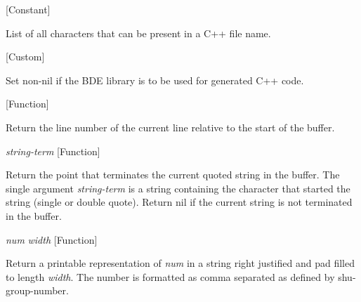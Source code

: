 \vspace{1em}
\noindent
{}
\usebox{\funcname}
 \hfill [Constant]

\begin{doc-string}
List of all characters that can be present in a C++ file name.
\end{doc-string}

\vspace{1em}
\noindent
{}
\usebox{\funcname}
 \hfill [Custom]

\begin{doc-string}
Set non-nil if the BDE library is to be used for generated C++ code.
\end{doc-string}

\vspace{1em}
\noindent
{}
\usebox{\funcname}
 \hfill [Function]

\begin{doc-string}
Return the line number of the current line relative to the start of the buffer.
\end{doc-string}

\vspace{1em}
\noindent
{}
\usebox{\funcname}\emph{string-term}
 \hfill [Function]

\begin{doc-string}
Return the point that terminates the current quoted string in the buffer.
The single argument \emph{string-term} is a string containing the character that
started the string (single or double quote).  Return nil if the current
string is not terminated in the buffer.
\end{doc-string}

\vspace{1em}
\noindent
{}
\usebox{\funcname}\emph{num} \emph{width}
 \hfill [Function]

\begin{doc-string}
Return a printable representation of \emph{num} in a string right justified
and pad filled to length \emph{width}.  The number is formatted as comma separated
as defined by shu-group-number.
\end{doc-string}

